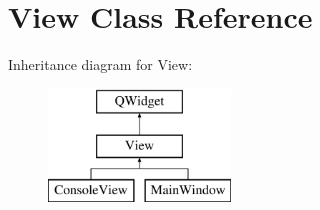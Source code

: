 \hypertarget{class_view}{}\section{View Class Reference}
\label{class_view}
Inheritance diagram for View\+:\begin{figure}[H]
\begin{center}
\leavevmode
\includegraphics[height=3.000000cm]{class_view}
\end{center}
\end{figure}
